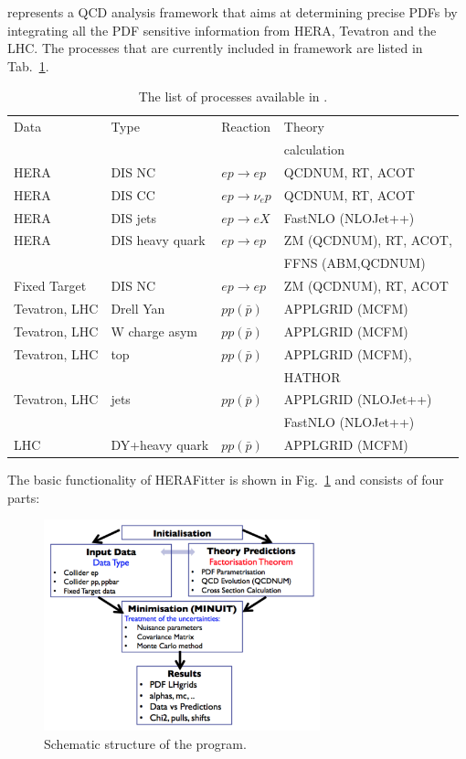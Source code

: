 \fitter represents a QCD analysis framework that aims at 
determining precise PDFs by integrating all the PDF sensitive information
from HERA, Tevatron and the LHC.
%
The processes that are currently included in \fitter framework are listed in Tab.~\ref{tab:proc}.
%
\begin{table}
\small
\scriptsize

\begin{tabular}{|l|l|l|l|}
\hline
Data &Type &  Reaction & Theory      \\
        &     &     & calculation \\
\hline

HERA &DIS NC   &$ep\to ep$ & QCDNUM, RT, ACOT \\
HERA &DIS CC   &$ep\to \nu_e p$ & QCDNUM, RT, ACOT\\
HERA &DIS jets &$ep\to eX$ & FastNLO (NLOJet++)\\
HERA &DIS heavy quark & $ep\to ep $& ZM (QCDNUM), RT, ACOT, \\
     &                     &            & FFNS (ABM,QCDNUM) \\
\hline
Fixed Target &DIS NC   &$ep\to ep$ & ZM (QCDNUM), RT, ACOT \\
\hline
Tevatron, LHC &Drell Yan &$pp(\bar p)$ & APPLGRID (MCFM) \\
Tevatron, LHC &W charge asym &$pp(\bar p)$ & APPLGRID (MCFM) \\
Tevatron, LHC &top &$pp(\bar p)$ & APPLGRID (MCFM),  \\
              &    &             & HATHOR \\
Tevatron, LHC &jets &$pp(\bar p)$ & APPLGRID (NLOJet++) \\
                &  & & FastNLO (NLOJet++) \\
LHC&  DY+heavy quark &$pp(\bar p)$ & APPLGRID (MCFM) \\
\hline
\end{tabular}
\caption{The list of processes available in \fitter.}
\label{tab:proc}
\end{table}
%
\normalsize
The basic functionality of HERAFitter is shown in Fig.~\ref{fig:flow} and consists of four parts: %
\begin{figure}[!ht]
   \centering
   \includegraphics[width=8cm]{flow.pdf}
   \caption{Schematic structure of the \fitter program.} 
 \label{fig:flow}
\end{figure}
